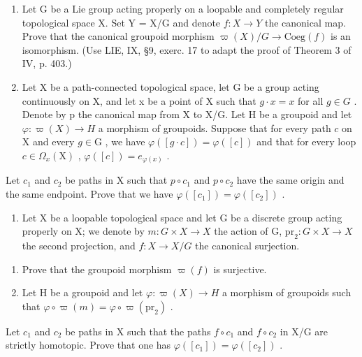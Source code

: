 \begin{enumerate}
\def\labelenumi{\arabic{enumi})}
\setcounter{enumi}{4}
\item
  Let G be a Lie group acting properly on a loopable and completely regular topological space X. Set Y = X/G and denote \(f: X \to Y\) the canonical map. Prove that the canonical groupoid morphism \(\varpi(X)/G \to \text{Coeg}(f)\) is an isomorphism. (Use LIE, IX, §9, exerc. 17 to adapt the proof of Theorem 3 of IV, p. 403.)
\item
  Let X be a path-connected topological space, let G be a group acting continuously on X, and let x be a point of X such that \(g \cdot x = x\) for all \(g \in G\) . Denote by p the canonical map from X to X/G. Let H be a groupoid and let \(\varphi: \varpi(X) \to H\) a morphism of groupoids. Suppose that for every path \(c\) on \(\mathrm{X}\) and every \(g\in \mathrm{G}\) , we have \(\varphi ([g\cdot c]) = \varphi ([c])\) and that for every loop \(c\in \Omega_x(\mathrm{X})\) , \(\varphi ([c]) = e_{\varphi (x)}\) .
\end{enumerate}

Let \(c_{1}\) and \(c_{2}\) be paths in X such that \(p \circ c_{1}\) and \(p \circ c_{2}\) have the same origin and the same endpoint. Prove that we have \(\varphi([c_{1}]) = \varphi([c_{2}])\) .

\begin{enumerate}
\def\labelenumi{\arabic{enumi})}
\setcounter{enumi}{6}
\tightlist
\item
  Let X be a loopable topological space and let G be a discrete group acting properly on X; we denote by \(m\colon G \times X \to X\) the action of G, \(\mathrm{pr}_2\colon G \times X \to X\) the second projection, and \(f\colon X \to X / G\) the canonical surjection.
\end{enumerate}

\begin{enumerate}
\def\labelenumi{\alph{enumi})}
\item
  Prove that the groupoid morphism \(\varpi(f)\) is surjective.
\item
  Let H be a groupoid and let \(\varphi\colon\varpi(X)\to H\) a morphism of groupoids such that \(\varphi\circ\varpi(m)=\varphi\circ\varpi(\mathrm{pr}_{2})\) .
\end{enumerate}

Let \(c_{1}\) and \(c_{2}\) be paths in X such that the paths \(f \circ c_{1}\) and \(f \circ c_{2}\) in X/G are strictly homotopic. Prove that one has \(\varphi([c_{1}]) = \varphi([c_{2}])\) .

